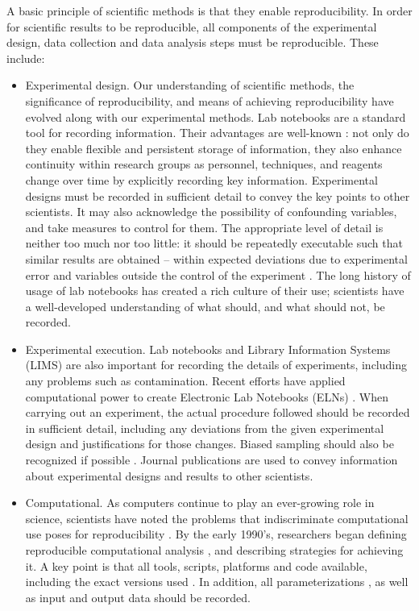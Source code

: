 A basic principle of scientific methods is that they enable reproducibility.  
In order for scientific results to be reproducible, all components of the 
experimental design, data collection and data analysis steps must be 
reproducible.  These include:
\begin{itemize}

  \item Experimental design.  Our understanding of scientific methods, the 
  significance of reproducibility, and means of achieving reproducibility 
  have evolved along with our experimental methods.  
  Lab notebooks are a standard tool for recording information.  Their 
  advantages are well-known \cite{rubacha2011eln}: not only do they enable 
  flexible and persistent storage of information, they also enhance 
  continuity within research groups as personnel, techniques, 
  and reagents change over time by explicitly recording key information.
  Experimental designs must be recorded in sufficient detail to convey the key
  points to other scientists.  It may also acknowledge the possibility of 
  confounding variables, and take measures to control for them.
  The appropriate level of detail is neither too much nor too little:
  it should be repeatedly executable such that similar results are obtained 
  -- within expected deviations due to experimental error and variables 
  outside the control of the experiment \cite{drummond2012reproducible}.
  The long history of usage of lab notebooks has created a rich culture of
  their use; scientists have a well-developed understanding of what should,
  and what should not, be recorded.

  \item Experimental execution.  Lab notebooks and Library Information Systems 
  (LIMS) are also important for recording the details of experiments, including 
  any problems such as contamination.  Recent efforts have applied 
  computational power to create Electronic Lab Notebooks (ELNs)
  \cite{talbott2005eln, rubacha2011eln, myers2001eln}.
  When carrying out an experiment, the actual procedure followed should be
  recorded in sufficient detail, including any deviations from the given 
  experimental design and justifications for those changes.
  Biased sampling should also be recognized if possible
  \cite{savovic2012influence, simmons2011false}.
  Journal publications are used to convey information about experimental
  designs and results to other scientists.  

  \item Computational.  As computers continue to play an ever-growing role in 
  science, scientists have noted the problems that indiscriminate computational 
  use poses for reproducibility \cite{donoho2009, peng2011reproducible}.  
  By the early 1990's, researchers began defining reproducible 
  computational analysis \cite{donoho_wavelab}, and describing strategies for 
  achieving it.  A key point is that all tools, scripts, platforms and code 
  available, including the exact versions used
   \cite{ince2012open, nekrutenko2012next, blankenberg2014dissemination}.
  In addition, all parameterizations \cite{landis2012call}, as well
  as input and output data should be recorded.


\end{itemize}

